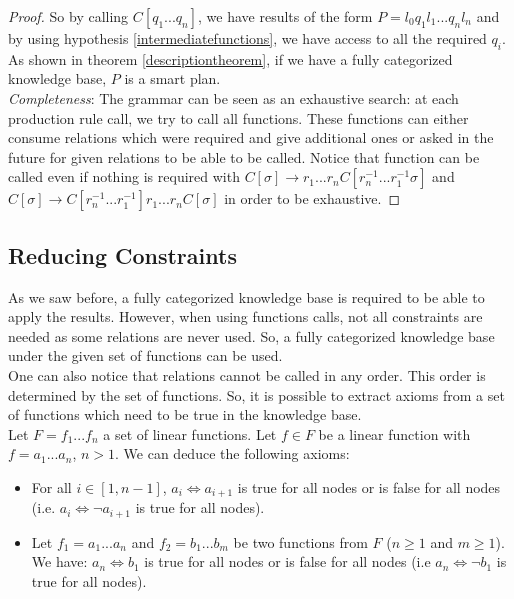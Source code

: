 \documentclass[10pt,a4paper,draft]{article}
\begin{document}
\begin{proof}
So by calling $C[q_1 ... q_n]$, we have results of the form $P = l_0 q_1 l_1 ... q_n l_n$ and by using hypothesis \ref{intermediatefunctions}, we have access to all the required $q_i$. As shown in theorem \ref{descriptiontheorem}, if we have a fully categorized knowledge base, $P$ is a smart plan.\\

\textit{Completeness}: The grammar can be seen as an exhaustive search: at each production rule call, we try to call all functions. These functions can either consume relations which were required and give additional ones or asked in the future for given relations to be able to be called. Notice that function can be called even if nothing is required with $C[\sigma] \rightarrow r_1 ... r_n C[r_{n}^{-1} ... r_1^{-1} \sigma]$ and $C[\sigma] \rightarrow C[r_{n}^{-1} ... r_1^{-1}] r_1 ... r_n C[\sigma]$ in order to be exhaustive.
\end{proof}

\subsection{Reducing Constraints}

As we saw before, a fully categorized knowledge base is required to be able to apply the results. However, when using functions calls, not all constraints are needed as some relations are never used. So, a fully categorized knowledge base under the given set of functions can be used.\\
One can also notice that relations cannot be called in any order. This order is determined by the set of functions. So, it is possible to extract axioms from a set of functions which need to be true in the knowledge base.\\
Let $F = f_1 ... f_n$ a set of linear functions.
Let $f \in F$ be a linear function with $f = a_1 ... a_n$, $n > 1$. We can deduce the following axioms:
\begin{itemize}
\item For all $i \in [1, n-1]$, $a_i \Leftrightarrow a_{i+1}$ is true for all nodes or is false for all nodes (i.e. $a_i \Leftrightarrow \neg a_{i+1}$ is true for all nodes).
\item Let $f_1 = a_1 ... a_n$ and $f_2 = b_1 ... b_m$ be two functions from $F$ ($n \geq 1$ and $m \geq 1$). We have: $a_n \Leftrightarrow b_1$ is true for all nodes or is false for all nodes (i.e $a_n \Leftrightarrow \neg b_1$ is true for all nodes).
\end{itemize}
\end{document}
